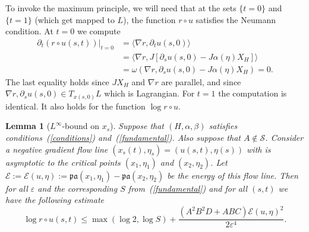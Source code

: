 \documentclass{amsart}
\newcommand{\Ecal}{{\mathcal{E}}}
\newcommand{\Scal}{{\mathcal{S}}}
\newcommand{\pacal}{\mathfrak{pa}}
\newtheorem{lemma}[proposition]{Lemma}
\theoremstyle{definition}
\theoremstyle{remark}
\numberwithin{equation}{section}
\begin{document}
To invoke the maximum principle, we will need that at the sets $\{t=0\}$ and $\{t=1\}$ (which get mapped to $L$), the function $r\circ u$ satisfies the Neumann condition. At $t=0$ we compute
\begin{align}
	\partial_t (r\circ u(s,t))|_{t=0}&=\langle \nabla r,\partial_t u(s,0)\rangle\label{neumann}\\
	&=\langle \nabla r, J[\partial_s u(s,0)-J\alpha(\eta)X_H]\rangle\nonumber\\
	&=\omega(\nabla r,\partial_s u(s,0)-J\alpha(\eta)X_H)=0.\nonumber
\end{align}
The last equality holds since $JX_H$ and $\nabla r$ are parallel, and since $\nabla r,\partial_su(s,0)\in T_{x(s,0)}L$ which is Lagrangian. For $t=1$ the computation is identical. It also holds for the function $\log r\circ u$. 
\begin{lemma}[$L^\infty$-bound on $x_s$]
	Suppose that $(H,\alpha,\beta)$ satisfies conditions~(\ref{conditions}) and~(\ref{fundamental}). Also suppose that $A\notin\Scal$. Consider a negative gradient flow line $(x_s(t),\eta_s)=(u(s,t),\eta(s))$ with is asymptotic to the critical points $(x_1,\eta_1)$ and $(x_2,\eta_2)$. Let $\Ecal:=\Ecal(u,\eta):=\pacal(x_1,\eta_1)-\pacal(x_2,\eta_2)$ be the energy of this flow line. Then for all $\varepsilon$ and the corresponding $S$ from~(\ref{fundamental}) and for all $(s,t)$ we have the following estimate
	$$\log r\circ u(s,t)\leq \max (\log 2,\log S) + \frac{(A^2B^2D+ABC)\Ecal(u,\eta)^2}{2\varepsilon^4}.$$	
\end{lemma}
\end{document}
